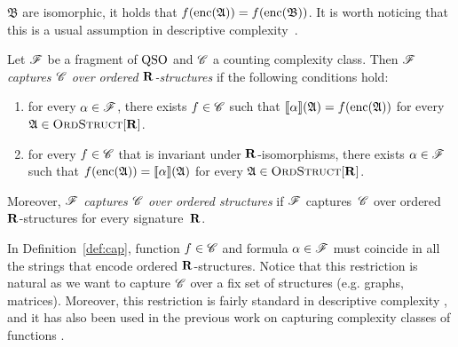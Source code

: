$\mathfrak{B}$ are isomorphic, it holds that $f({\rm enc}(\mathfrak{A})) = f({\rm enc}(\mathfrak{B}))$. It is worth noticing that this is a usual assumption in descriptive complexity~\cite{L04}.
\begin{definition} \label{def:cap}
	Let $\mathscr{F}$ be a fragment of ${\rm QSO}$ and $\mathscr{C}$ a counting complexity class. Then {\em  $\mathscr{F}$ captures $\mathscr{C}$ over ordered $\mathbf{R}$-structures} if the  following conditions hold:
	\begin{enumerate}
		\item for every $\alpha \in \mathscr{F}$, there exists $f \in \mathscr{C}$ such that ${\llbracket{}{\alpha}\rrbracket}(\mathfrak{A}) = f({\rm enc}(\mathfrak{A}))$ for every $\mathfrak{A} \in \text{\sc OrdStruct}[\mathbf{R}]$. 
		
		\item for every $f \in \mathscr{C}$ that is invariant under $\mathbf{R}$-isomorphisms, there exists $\alpha \in \mathscr{F}$ such that   $f({\rm enc}(\mathfrak{A})) = {\llbracket{}{\alpha}\rrbracket}(\mathfrak{A})$ for every $\mathfrak{A} \in \text{\sc OrdStruct}[\mathbf{R}]$.
	\end{enumerate} 
	Moreover, {\em $\mathscr{F}$ captures $\mathscr{C}$ over ordered structures} if $\mathscr{F}$ captures~$\mathscr{C}$ over ordered $\mathbf{R}$-structures for every signature~$\mathbf{R}$.
\end{definition}
In Definition~\ref{def:cap}, function $f \in \mathscr{C}$ and formula $\alpha \in \mathscr{F}$ must coincide in all the strings that encode ordered $\mathbf{R}$-structures. Notice that this restriction is natural as we want to capture %
$\mathscr{C}$ over a fix set of structures (e.g. graphs, matrices).
Moreover, this restriction is fairly standard in descriptive complexity \cite{immerman1999descriptive,L04}, and it has also been used in the previous work on capturing complexity classes of functions \cite{SalujaST95,ComptonG96}.

